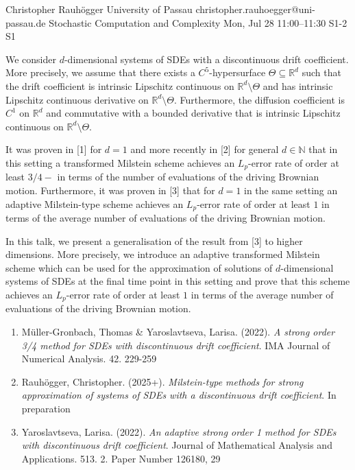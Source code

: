 \documentclass[12pt,lettersize,oneside]{book} %
\begin{document}
\begin{talk}
  {Christopher Rauh\"ogger}%
  {University of Passau}%
  {christopher.rauhoegger@uni-passau.de}%
  {Stochastic Computation and Complexity}%
  {}%
  {}%
  {Mon, Jul 28 11:00--11:30}%
  {S1-2}%
  {S1}%
    
   
We consider $d$-dimensional systems of SDEs with a discontinuous drift coefficient. More precisely,
we assume that there exists a $C^{5}$-hypersurface
$\Theta\subseteq \mathbb{R}^{d}$ such that the drift coefficient is intrinsic Lipschitz continuous on $\mathbb{R}^{d}\setminus \Theta$ and has intrinsic Lipschitz continuous derivative on $\mathbb{R}^{d}\setminus \Theta$.
Furthermore, the diffusion coefficient is $C^{1}$ on $\mathbb{R}^{d}$ and commutative with a bounded derivative that is intrinsic Lipschitz continuous on $\mathbb{R}^{d}\setminus \Theta$.

It was proven in [1] for $d = 1$ and more recently in [2] for general $d \in \mathbb{N}$ that in this setting a transformed Milstein scheme achieves an $L_{p}$-error rate of order at least $3/4-$ in terms of the number of evaluations of the
driving Brownian motion.
Furthermore, it was proven in [3] that for $d = 1$ in the same setting an adaptive Milstein-type scheme achieves an $L_{p}$-error rate of order at least $1$ in terms of the average number of evaluations of the driving Brownian motion. 

In this talk, we present a generalisation of the result from [3] to higher dimensions. More precisely, we introduce an adaptive transformed Milstein scheme which can be used for the approximation of solutions of $d$-dimensional systems of SDEs at the final time point in this setting and
prove that this scheme achieves an $L_{p}$-error rate of order at least $1$ in terms of the average number of evaluations of the
driving Brownian motion.

\medskip

\begin{enumerate}
 \item[{[1]}] M\"{u}ller-Gronbach, Thomas \& Yaroslavtseva, Larisa. (2022). {\it A strong order 3/4 method for {SDE}s with discontinuous drift
  coefficient}. IMA Journal of Numerical Analysis. 42. 229-259
 \item[{[2]}] Rauh\"ogger, Christopher. (2025+). {\it Milstein-type methods for strong approximation of systems of SDEs with a discontinuous drift coefficient}. In preparation
 \item[{[3]}] Yaroslavtseva, Larisa. (2022). {\it An adaptive strong order 1 method for {SDE}s with
  discontinuous drift coefficient}. Journal of Mathematical Analysis and Applications. 513. 2. Paper Number 126180, 29
\end{enumerate}

\end{talk}
\end{document}
